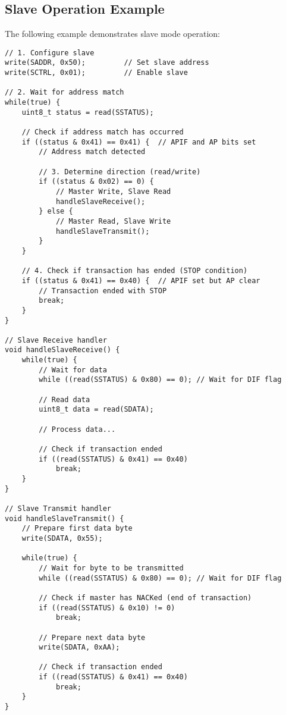 \subsection{Slave Operation Example}
The following example demonstrates slave mode operation:

\begin{verbatim}
// 1. Configure slave
write(SADDR, 0x50);         // Set slave address
write(SCTRL, 0x01);         // Enable slave

// 2. Wait for address match
while(true) {
    uint8_t status = read(SSTATUS);
    
    // Check if address match has occurred
    if ((status & 0x41) == 0x41) {  // APIF and AP bits set
        // Address match detected
        
        // 3. Determine direction (read/write)
        if ((status & 0x02) == 0) {
            // Master Write, Slave Read
            handleSlaveReceive();
        } else {
            // Master Read, Slave Write
            handleSlaveTransmit();
        }
    }
    
    // 4. Check if transaction has ended (STOP condition)
    if ((status & 0x41) == 0x40) {  // APIF set but AP clear
        // Transaction ended with STOP
        break;
    }
}

// Slave Receive handler
void handleSlaveReceive() {
    while(true) {
        // Wait for data
        while ((read(SSTATUS) & 0x80) == 0); // Wait for DIF flag
        
        // Read data
        uint8_t data = read(SDATA);
        
        // Process data...
        
        // Check if transaction ended
        if ((read(SSTATUS) & 0x41) == 0x40)
            break;
    }
}

// Slave Transmit handler
void handleSlaveTransmit() {
    // Prepare first data byte
    write(SDATA, 0x55);
    
    while(true) {
        // Wait for byte to be transmitted
        while ((read(SSTATUS) & 0x80) == 0); // Wait for DIF flag
        
        // Check if master has NACKed (end of transaction)
        if ((read(SSTATUS) & 0x10) != 0)
            break;
            
        // Prepare next data byte
        write(SDATA, 0xAA);
        
        // Check if transaction ended
        if ((read(SSTATUS) & 0x41) == 0x40)
            break;
    }
}
\end{verbatim}